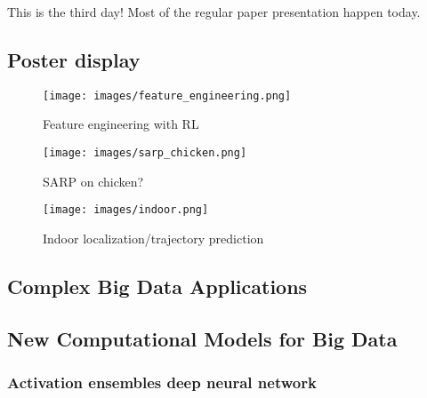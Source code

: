 This is the third day! Most of the regular paper presentation happen today.

\subsection{Poster display}
\label{section:poster}

\begin{figure}[!ht]
    \centering
    \texttt{[image: images/feature\_engineering.png]}
    \caption{Feature engineering with RL}
    \label{fig:my_label}
\end{figure}{}



\begin{figure}[!ht]
    \centering
    \texttt{[image: images/sarp\_chicken.png]}
    \caption{SARP on chicken?}
    \label{fig:my_label}
\end{figure}{}

\begin{figure}[!ht]
    \centering
    \texttt{[image: images/indoor.png]}
    \caption{Indoor localization/trajectory prediction}
    \label{fig:my_label}
\end{figure}{}



\subsection{Complex Big Data Applications}


\subsection{New Computational Models for Big Data}

\subsubsection{Activation ensembles deep neural network}

